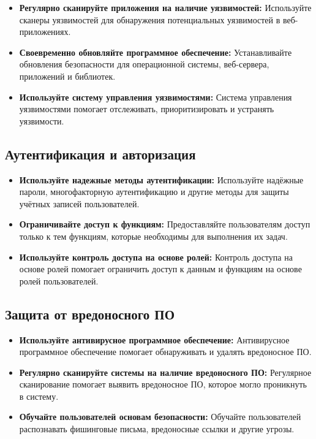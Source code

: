 \documentclass[a4paper,12pt]{diplom}
\begin{document}
	 \begin{itemize}
	 	\item \textbf{Регулярно сканируйте приложения на наличие уязвимостей:} Используйте сканеры уязвимостей для обнаружения потенциальных уязвимостей в веб-приложениях.
	 	\item \textbf{Своевременно обновляйте программное обеспечение:} Устанавливайте обновления безопасности для операционной системы, веб-сервера, приложений и библиотек.
	 	\item \textbf{Используйте систему управления уязвимостями:} Система управления уязвимостями помогает отслеживать, приоритизировать и устранять уязвимости.
	 \end{itemize}
	 
	 \subsection{Аутентификация и авторизация}
	 
	 \begin{itemize}
	 	\item \textbf{Используйте надежные методы аутентификации:} Используйте надёжные пароли, многофакторную аутентификацию и другие методы для защиты учётных записей пользователей.
	 	\item \textbf{Ограничивайте доступ к функциям:} Предоставляйте пользователям доступ только к тем функциям, которые необходимы для выполнения их задач.
	 	\item \textbf{Используйте контроль доступа на основе ролей:} Контроль доступа на основе ролей помогает ограничить доступ к данным и функциям на основе ролей пользователей. 
	 \end{itemize}
	 
	 \subsection{Защита от вредоносного ПО}
	 
	 \begin{itemize}
	 	\item \textbf{Используйте антивирусное программное обеспечение:} Антивирусное программное обеспечение помогает обнаруживать и удалять вредоносное ПО.
	 	\item \textbf{Регулярно сканируйте системы на наличие вредоносного ПО:} Регулярное сканирование помогает выявить вредоносное ПО, которое могло проникнуть в систему.
	 	\item \textbf{Обучайте пользователей основам безопасности:} Обучайте пользователей распознавать фишинговые письма, вредоносные ссылки и другие угрозы.
	 \end{itemize}
	 
\end{document}
